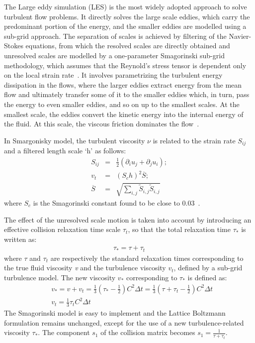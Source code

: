 The Large eddy simulation (LES) is the most widely adopted approach to solve turbulent flow problems. It directly solves the large scale eddies, which carry the predominant portion of the energy, and the smaller eddies are modelled using a sub-grid approach. The separation of scales is achieved by filtering of the Navier-Stokes equations, from which the resolved scales are directly obtained and unresolved scales are modelled by a one-parameter Smagorinski sub-grid methodology, which assumes that the Reynold's stress tensor is dependent only on the local strain rate~\citep{Smagorinsky1963}. It involves parametrizing the turbulent energy dissipation in the flows, where the larger eddies extract energy from the mean flow and ultimately transfer some of it to the smaller eddies which, in turn, pass the energy to even smaller eddies, and so on up to the smallest scales. At the smallest scale, the eddies convert the kinetic energy into the internal energy of the fluid. At this scale, the viscous friction dominates the flow~\citep{Frisch1995}.


In Smargonisky model, the turbulent viscosity $\nu$ is related to the strain rate $S_{ij}$ and a filtered length scale `h' as follows:
\begin{eqnarray}
S_{ij} & = &\frac{1}{2}(\partial_i u_j + \partial_j u_i); \\
\mathit{v}_{\mathit{t}} & = & (\mathit{S}_{c}\mathit{h})^{2}\overline{S}; \\
\overline{S} & = & \sqrt{\sum\limits_{\mathit{i,j}}{\tilde{S}_{\mathit{i,j}}\tilde{S}_{\mathit{i,j}}}}
\end{eqnarray}
where $\mathit{S}_{c}$ is the Smagorinski constant found to be close to 0.03~\citep{yu2005}. 

The effect of the unresolved scale motion is taken into account by introducing an effective collision relaxation time scale $\tau_{t}$, so that the total relaxation time $\tau_{*}$ is written as:
\begin{eqnarray}
\tau_{*}=\tau + \tau_{t}
\end{eqnarray} 
where $\tau$ and $\tau_{t}$ are respectively the standard relaxation times corresponding to the true fluid viscosity \textit{v} and the turbulence viscosity $\mathit{v}_{\mathit{t}}$, defined by a sub-grid turbulence model. The new viscosity $\mathit{v}_{*}$ corresponding to $\tau_{*}$ is defined as:
\begin{eqnarray}
& \mathit{v}_{*}=\mathit{v}+\mathit{v}_{\mathit{t}}=\frac{1}{3}(\tau_{*}-\frac{1}{2})\mathit{C}^{2} \Delta \mathit{t} =\frac{1}{3}(\tau+\tau_{t}-\frac{1}{2})\mathit{C}^{2} \Delta \mathit{t}  \\
& \mathit{v}_{\mathit{t}}=\frac{1}{3}\tau_{\mathit{t}}\mathit{C}^{2} \Delta \textit{t}
\end{eqnarray} 
The Smagorinski model is easy to implement and the Lattice Boltzmann formulation remains unchanged, except for the use of a new turbulence-related viscosity $\tau_{*}$. The component $s_1$ of the collision matrix becomes $s_1 = \frac{1}{\tau+\tau_t}$.

